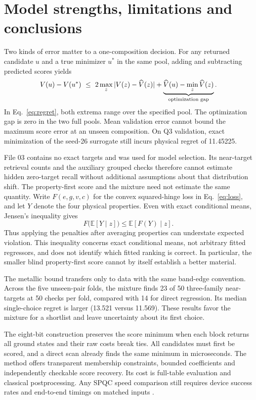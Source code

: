 

\section{Model strengths, limitations and conclusions}
Two kinds of error matter to a one-composition decision. For any returned candidate $u$ and a true minimizer $u^*$ in the same pool, adding and subtracting predicted scores yields
\begin{equation}
 V(u)-V(u^*)\ \leq\
 2\max_{z}|V(z)-\widehat V(z)|+
 \underbrace{\widehat V(u)-\min_z\widehat V(z)}_{\text{optimization gap}} .
 \label{eq:regret}
\end{equation}
In Eq.~\eqref{eq:regret}, both extrema range over the specified pool. The optimization gap is zero in the two full pools. Mean validation error cannot bound the maximum score error at an unseen composition. On Q3 validation, exact minimization of the seed-26 surrogate still incurs physical regret of 11.45225.

File 03 contains no exact targets and was used for model selection. Its near-target retrieval counts and the auxiliary grouped checks therefore cannot estimate hidden zero-target recall without additional assumptions about that distribution shift. The property-first score and the mixture need not estimate the same quantity. Write $F(e,g,v,c)$ for the convex squared-hinge loss in Eq.~\eqref{eq:loss}, and let $Y$ denote the four physical properties. Even with exact conditional means, Jensen's inequality gives
\[
 F\big(\mathbb E[Y\mid z]\big)\leq\mathbb E[F(Y)\mid z].
\]
Thus applying the penalties after averaging properties can understate expected violation. This inequality concerns exact conditional means, not arbitrary fitted regressors, and does not identify which fitted ranking is correct. In particular, the smaller blind property-first score cannot by itself establish a better material.


The metallic bound transfers only to data with the same band-edge convention. Across the five unseen-pair folds, the mixture finds 23 of 50 three-family near-targets at 50 checks per fold, compared with 14 for direct regression. Its median single-choice regret is larger (13.521 versus 11.569). These results favor the mixture for a shortlist and leave uncertainty about its first choice.

The eight-bit construction preserves the score minimum when each block returns all ground states and their raw costs break ties. All candidates must first be scored, and a direct scan already finds the same minimum in microseconds. The method offers transparent membership constraints, bounded coefficients and independently checkable score recovery. Its cost is full-table evaluation and classical postprocessing. Any SPQC speed comparison still requires device success rates and end-to-end timings on matched inputs \cite{speed}.

